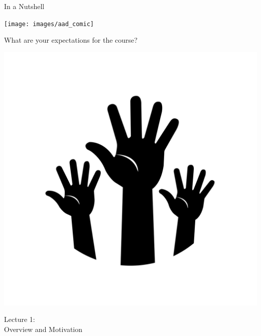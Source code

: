 \begin{frame}[c]{In a Nutshell}

\texttt{[image: images/aad\_comic]}

\end{frame}
\begin{frame}[c]{}

\huge
\centering
What are your expectations for the course?

\bigskip

\includegraphics[scale=0.1]{images/hands.png}

\end{frame}
\begin{frame}[c]{}

\centering
\huge
Lecture 1:\\
Overview and Motivation
\end{frame}
